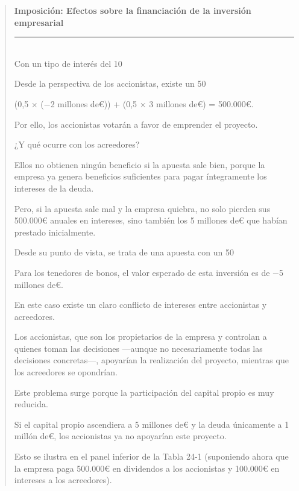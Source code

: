 \documentclass[10pt,a4paper]{article}
\newenvironment{specialblock}[1]{%
      \begin{quote} %
      \small %
      \noindent\textbf{#1}\\[-0.3em] %
      \rule{\linewidth}{0.4pt}\\[0.6em]}{
      \end{quote}}
\begin{document}
\begin{specialblock}{Imposición: Efectos sobre la financiación de la inversión empresarial}
    Con un tipo de interés del 10 %
    
    Desde la perspectiva de los accionistas, existe un 50 %
    
    (0,5 × (−2 millones de€)) + (0,5 × 3 millones de€) = 500.000€.
    
    Por ello, los accionistas votarán a favor de emprender el proyecto.
    
    ¿Y qué ocurre con los acreedores?
    
    Ellos no obtienen ningún beneficio si la apuesta sale bien, porque la empresa ya genera beneficios suficientes para pagar íntegramente los intereses de la deuda.
    
    Pero, si la apuesta sale mal y la empresa quiebra, no solo pierden sus 500.000€ anuales en intereses, sino también los 5 millones de€ que habían prestado inicialmente.
    
    Desde su punto de vista, se trata de una apuesta con un 50 %
    
    Para los tenedores de bonos, el valor esperado de esta inversión es de −5 millones de€.
    
    En este caso existe un claro conflicto de intereses entre accionistas y acreedores.
    
    Los accionistas, que son los propietarios de la empresa y controlan a quienes toman las decisiones —aunque no necesariamente todas las decisiones concretas—, apoyarían la realización del proyecto, mientras que los acreedores se opondrían.
    
    Este problema surge porque la participación del capital propio es muy reducida.
    
    Si el capital propio ascendiera a 5 millones de€ y la deuda únicamente a 1 millón de€, los accionistas ya no apoyarían este proyecto.
    
    Esto se ilustra en el panel inferior de la Tabla 24-1 (suponiendo ahora que la empresa paga 500.000€ en dividendos a los accionistas y 100.000€ en intereses a los acreedores).
    

\end{specialblock}
\end{document}
